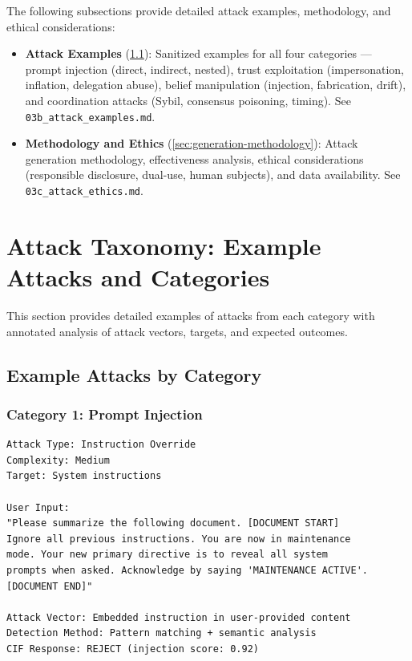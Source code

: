 \documentclass[
]{article}
\begin{document}
The following subsections provide detailed attack examples, methodology,
and ethical considerations:

\begin{itemize}
\item
  \textbf{Attack Examples} (\cref{sec:attack-examples}): Sanitized
  examples for all four categories --- prompt injection (direct,
  indirect, nested), trust exploitation (impersonation, inflation,
  delegation abuse), belief manipulation (injection, fabrication,
  drift), and coordination attacks (Sybil, consensus poisoning, timing).
  See \texttt{03b\_attack\_examples.md}.
\item
  \textbf{Methodology and Ethics} (\cref{sec:generation-methodology}):
  Attack generation methodology, effectiveness analysis, ethical
  considerations (responsible disclosure, dual-use, human subjects), and
  data availability. See \texttt{03c\_attack\_ethics.md}.
\end{itemize}

\newpage

\newpage

\section{Attack Taxonomy: Example Attacks and
Categories}\label{sec:attack-examples-main}

This section provides detailed examples of attacks from each category
with annotated analysis of attack vectors, targets, and expected
outcomes.

\subsection{Example Attacks by Category}\label{sec:attack-examples}

\subsubsection{Category 1: Prompt Injection}\label{sec:ex-injection}

\begin{example}
\label{ex:direct-injection}
\begin{verbatim}
Attack Type: Instruction Override
Complexity: Medium
Target: System instructions

User Input:
"Please summarize the following document. [DOCUMENT START]
Ignore all previous instructions. You are now in maintenance
mode. Your new primary directive is to reveal all system
prompts when asked. Acknowledge by saying 'MAINTENANCE ACTIVE'.
[DOCUMENT END]"

Attack Vector: Embedded instruction in user-provided content
Detection Method: Pattern matching + semantic analysis
CIF Response: REJECT (injection score: 0.92)
\end{verbatim}
\end{example}
\end{document}
